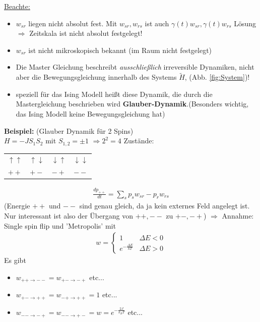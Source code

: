\documentclass[12pt]{article}
\begin{document}
\underline{Beachte:} 
\begin{itemize}
\item $w_{sr}$ liegen nicht absolut fest. Mit $w_{sr}, w_{rs}$ ist auch $\gamma (t) w_{sr}, \gamma(t) w_{rs}$ Lösung \\  $\Rightarrow$ Zeitskala ist nicht absolut festgelegt!
\item $w_{sr}$ ist nicht mikroskopisch bekannt (im Raum nicht festgelegt)
\item Die Master Gleichung beschreibt \textit{ausschließlich} irreversible Dynamiken, nicht aber die Bewegungsgleichung innerhalb des Systems $\tilde{H}$, (Abb. \ref{fig:System})! 
\item speziell für das Ising Modell heißt diese Dynamik, die durch die Mastergleichung beschrieben wird  \textbf{Glauber-Dynamik}.(Besonders wichtig, das Ising Modell keine Bewegungsgleichung hat)
\end{itemize}


\textbf{Beispiel:} (Glauber Dynamik für 2 Spins) \\ 
$H=-J S_1 S_2$ mit $S_{1,2} = \pm 1$
$\Rightarrow 2^2 =4$ Zustände: 
\begin{center}
\begin{tabular}{c c c c}
$\uparrow \uparrow$ & $\uparrow \downarrow$ & $\downarrow \uparrow$ & $ \downarrow \downarrow$ \\ 
$++$ & $+-$ & $-+$ & $--$ \\ 
\end{tabular} 
\end{center}

 \begin{align*}
 \frac{dp_{++}}{dt} = \sum_s p_s w_{sr} - p_r w_{rs}
 \end{align*}
 (Energie $++$ und $--$ sind genau gleich, da ja kein externes Feld angelegt ist. Nur interessant ist also der Übergang von $++, --$ zu $+-,-+$) $\Rightarrow$ Annahme: Single spin flip und 'Metropolis' mit 
 \begin{align*}
 w=
 \begin{cases}
 1 & \Delta E <0 \\
 e^{- \frac{\Delta E}{kT}} & \Delta E>0
 \end{cases}
 \end{align*}
 Es gibt 
 \begin{itemize}
 \item  $w_{++ \rightarrow --}= w_{+- \rightarrow -+}$ etc...
 \item $w_{+- \rightarrow ++}= w_{-+ \rightarrow ++}=1$ etc...
 \item $w_{-- \rightarrow -+}= w_{-- \rightarrow +-}= w= e^{-\frac{2J}{k_BT}}$ etc... 
 \end{itemize}
 
\end{document}
